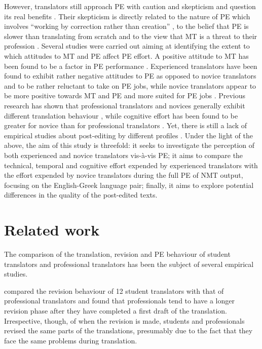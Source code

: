\documentclass[output=paper]{langscibook}
\begin{document}
However, translators still approach PE with caution and skepticism and question its real benefits \citep{GaspariWay2014, koponen2012comparing, Moorkens2018}. Their skepticism is directly related to the nature of PE which involves “working by correction rather than creation” \citep[2]{Wagner1985}, to the belief that PE is slower than translating from scratch and to the view that MT is a threat to their profession \citep[58]{Moorkens2018}. Several studies were carried out aiming at identifying the extent to which attitudes to MT and PE affect PE effort. A positive attitude to MT has been found to be a factor in PE performance \citep{De_almeida2013, Mitchell2015CommunityPO}. Experienced translators have been found to exhibit rather negative attitudes to PE as opposed to novice translators \citep{moorkens-obrien-2015-post} and to be rather reluctant to take on PE jobs, while novice translators appear to be more positive towards MT and PE and more suited for PE jobs \citep{García2010, Yamada2015}. Previous research has shown that professional translators and novices generally exhibit different translation behaviour \citep{CarlBuch-Kromann2010, CarlJensen2010, Hvelplund2011, dragsted2013towards, moorkens-obrien-2015-post, nitzke2019problem, SchaefferHansen-Schirra2019}, while cognitive effort has been found to be greater for novice than for professional translators \citep{GöpferichStadlober2011}. Yet, there is still a lack of empirical studies about post-editing by different profiles \citep{Mesa-Lao2014}. Under the light of the above, the aim of this study is threefold: it seeks to investigate the perception of both experienced and novice translators vis-à-vis PE; it aims to compare the technical, temporal and cognitive effort \citep{krings2001repairing} expended by experienced translators with the effort expended by novice translators during the full PE of NMT output, focusing on the English-Greek language pair; finally, it aims to explore potential differences in the quality of the post-edited texts.

\section{Related work} 
The comparison of the translation, revision and PE behaviour of student translators and professional translators has been the subject of several empirical studies.

\citet{CarlJensen2010} compared the revision behaviour of 12 student translators with that of professional translators and found that professionals tend to have a longer revision phase after they have completed a first draft of the translation. Irrespective, though, of when the revision is made, students and professionals revised the same parts of the translations, presumably due to the fact that they face the same problems during translation.
\end{document}
